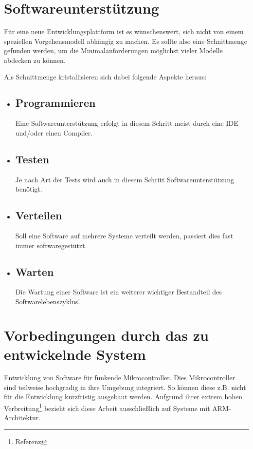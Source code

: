 \iffalse

\section{Softwareunterstützung}
Für eine neue Entwicklungsplattform ist es wünschenswert, sich nicht von einem
speziellen Vorgehensmodell abhängig zu machen. Es sollte also eine Schnittmenge
gefunden werden, um die Minimalanforderungen möglichst vieler Modelle abdecken
zu können.

Als Schnittmenge kristallisieren sich dabei folgende Aspekte heraus:
\begin{itemize}
  \item \subsection*{Programmieren} Eine Softwareunterstützung erfolgt in diesem
  Schritt meist durch eine IDE und/oder einen Compiler.
  \item \subsection*{Testen} Je nach Art der Tests wird auch in diesem Schritt
  Softwareunterstützung benötigt. 
  \item \subsection*{Verteilen} Soll eine Software auf mehrere
  Systeme verteilt werden, passiert dies fast immer softwaregestützt.
  \item \subsection*{Warten} Die Wartung einer Software ist ein weiterer
  wichtiger Bestandteil des Softwarelebenszyklus'.
\end{itemize}
\section{Vorbedingungen durch das zu entwickelnde System}\label{sec:vorb}
Entwicklung von Software für funkende Mikrocontroller. Dies Mikrocontroller sind
teilweise hochgradig in ihre Umgebung integriert. So können diese z.B.
nicht für die Entwicklung kurzfristig ausgebaut werden. Aufgrund ihrer extrem
hohen Verbreitung\footnote{Referenz} bezieht sich diese Arbeit ausschließlich
auf Systeme mit ARM-Architektur.
